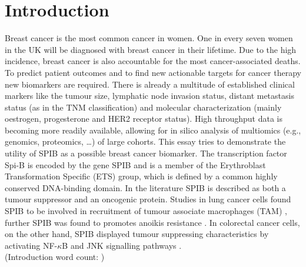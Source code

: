 \section{Introduction}
\countem

Breast cancer is the most common cancer in women.
One in every seven women in the UK will be diagnosed with breast cancer in their lifetime\cite{cancerresearchuk_2021}. 
Due to the high incidence, breast cancer is also accountable for the most cancer-associated deaths.
To predict patient outcomes and to find new actionable targets for cancer therapy new biomarkers are required.
There is already a multitude of established clinical markers like the tumour size, lymphatic node invasion status, distant metastasis status (as in the TNM classification) and molecular characterization (mainly oestrogen, progesterone and HER2 receptor status).
High throughput data is becoming more readily available, allowing for in silico analysis of multiomics (e.g., genomics, proteomics, \ldots) of large cohorts.
This essay tries to demonstrate the utility of SPIB as a possible breast cancer biomarker.
The transcription factor Spi-B is encoded by the gene SPIB and is a member of the Erythroblast Transformation Specific (ETS) group, which is defined by a common highly conserved DNA-binding domain.
In the literature SPIB is described as both a tumour suppressor and an oncogenic protein.
Studies in lung cancer cells found SPIB to be involved in recruitment of tumour associate macrophages (TAM) \cite{Huang2021}, further SPIB was found to promotes anoikis resistance \cite{Zhang2020}.
In colorectal cancer cells, on the other hand, SPIB displayed tumour suppressing characteristics by activating NF-$\kappa$B and JNK signalling pathways \cite{Zhao2021}.
\\
\endcountem 
(Introduction word count: \thewordcount{})